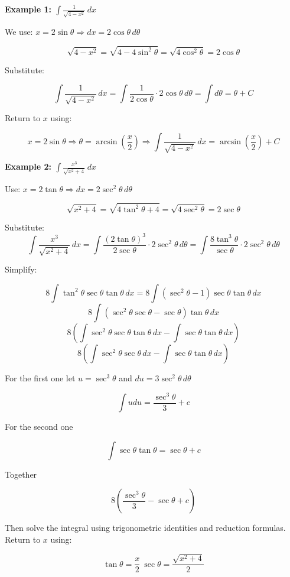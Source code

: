 \textbf{Example 1: \( \int \frac{1}{\sqrt{4 - x^2}} \,dx \)}

We use: \( x = 2\sin \theta \Rightarrow dx = 2\cos \theta\, d\theta \)

\[
    \sqrt{4 - x^2} = \sqrt{4 - 4\sin^2 \theta} = \sqrt{4\cos^2 \theta} = 2\cos \theta
\]

Substitute:

\[
    \int \frac{1}{\sqrt{4 - x^2}} \,dx = \int \frac{1}{2\cos \theta} \cdot 2\cos \theta \,d\theta = 
    \int d\theta = \theta + C
\]

Return to \(x\) using:

\[
    x = 2\sin \theta \Rightarrow \theta = \arcsin\left(\frac{x}{2}\right)
    \Rightarrow \boxed{\int \frac{1}{\sqrt{4 - x^2}} \,dx = \arcsin\left(\frac{x}{2}\right) + C}
\]

\textbf{Example 2: \( \int \frac{x^3}{\sqrt{x^2 + 4}} \,dx \)}

Use: \( x = 2\tan \theta \Rightarrow dx = 2\sec^2 \theta\, d\theta \)

\[
    \sqrt{x^2 + 4} = \sqrt{4\tan^2 \theta + 4} = \sqrt{4\sec^2 \theta} = 2\sec \theta
\]

Substitute:
\[
    \int \frac{x^3}{\sqrt{x^2 + 4}}\,dx = \int \frac{{(2\tan \theta)}^3}{2\sec \theta} \cdot 2\sec^2 \theta\, d\theta
    = \int \frac{8\tan^3 \theta}{\sec \theta} \cdot 2\sec^2 \theta\, d\theta
\]

Simplify:

\[
    8\int \tan^{2}\theta\sec\theta\tan\theta \,dx = 8\int (\sec^2\theta - 1)\sec\theta\tan\theta \,dx 
\]
\[
    8\int (\sec^2\theta\sec\theta - \sec\theta)\tan\theta \,dx 
\]
\[
    8\left(\int \sec^2\theta\sec\theta\tan\theta \,dx - \int\sec\theta\tan\theta \,dx \right) 
\]
\[
    8\left(\int \sec^2\theta\sec\theta \,dx - \int\sec\theta\tan\theta \,dx \right) 
\]

For the first one let \(u = \sec^3\theta\) and \(du = 3\sec^2\theta\,d\theta\) 

\[
    \int udu = \frac{\sec^3\theta}{3} + c
\]

For the second one

\[
    \int \sec\theta\tan\theta = \sec\theta + c
\]

Together

\[
    8\left(  \frac{\sec^3\theta}{3} - \sec\theta + c\right)
\]

Then solve the integral using trigonometric identities and reduction formulas. Return to \(x\) using:

\[
    \tan\theta = \frac{x}{2}\ \sec\theta = \frac{\sqrt{x^2 + 4}}{2}
\]

